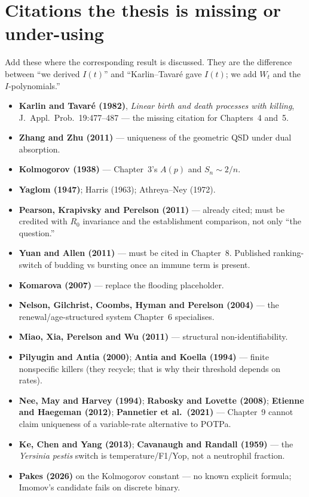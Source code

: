 \documentclass[11pt,a4paper]{report}
\newcommand{\yp}{\textit{Yersinia pestis}}
\begin{document}
\section{Citations the thesis is missing or under-using}
\label{sec:cites}

Add these where the corresponding result is discussed. They are the
difference between ``we derived \(I(t)\)'' and ``Karlin--Tavar\'e gave
\(I(t)\); we add \(W_t\) and the \(I\)-polynomials.''

\begin{itemize}
\item \textbf{Karlin and Tavar\'e (1982)}, \emph{Linear birth and death
  processes with killing}, J.\ Appl.\ Prob.\ 19:477--487 --- the missing
  citation for Chapters~4 and~5.
\item \textbf{Zhang and Zhu (2011)} --- uniqueness of the geometric QSD
  under dual absorption.
\item \textbf{Kolmogorov (1938)} --- Chapter~3's \(A(p)\) and
  \(S_n\sim 2/n\).
\item \textbf{Yaglom (1947)}; Harris (1963); Athreya--Ney (1972).
\item \textbf{Pearson, Krapivsky and Perelson (2011)} --- already cited;
  must be credited with \(R_0\) invariance and the establishment
  comparison, not only ``the question.''
\item \textbf{Yuan and Allen (2011)} --- must be cited in Chapter~8.
  Published ranking-switch of budding vs bursting once an immune term is
  present.
\item \textbf{Komarova (2007)} --- replace the flooding placeholder.
\item \textbf{Nelson, Gilchrist, Coombs, Hyman and Perelson (2004)} ---
  the renewal/age-structured system Chapter~6 specialises.
\item \textbf{Miao, Xia, Perelson and Wu (2011)} --- structural
  non-identifiability.
\item \textbf{Pilyugin and Antia (2000)}; \textbf{Antia and Koella
  (1994)} --- finite nonspecific killers (they recycle; that is why their
  threshold depends on rates).
\item \textbf{Nee, May and Harvey (1994)}; \textbf{Rabosky and Lovette
  (2008)}; \textbf{Etienne and Haegeman (2012)}; \textbf{Pannetier et
  al.\ (2021)} --- Chapter~9 cannot claim uniqueness of a variable-rate
  alternative to POTPa.
\item \textbf{Ke, Chen and Yang (2013)}; \textbf{Cavanaugh and Randall
  (1959)} --- the \yp{} switch is temperature/F1/Yop, not a neutrophil
  fraction.
\item \textbf{Pakes (2026)} on the Kolmogorov constant --- no known
  explicit formula; Imomov's candidate fails on discrete binary.
\end{itemize}
\end{document}

